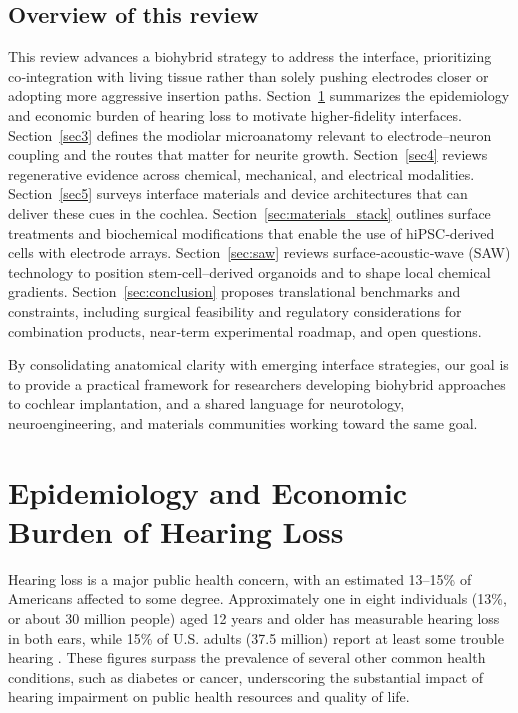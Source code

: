 \documentclass[referee,pdflatex, sn-vancouver-num]{sn-jnl}%
\theoremstyle{thmstyleone}%
\theoremstyle{thmstyletwo}%
\theoremstyle{thmstylethree}%
\begin{document}
\subsection{Overview of this review}
This review advances a biohybrid strategy to address the interface, prioritizing co‑integration with living tissue rather than solely pushing electrodes closer or adopting more aggressive insertion paths. Section~\ref{sec2} summarizes the epidemiology and economic burden of hearing loss to motivate higher‑fidelity interfaces. Section~\ref{sec3} defines the modiolar microanatomy relevant to electrode–neuron coupling and the routes that matter for neurite growth. Section~\ref{sec4} reviews regenerative evidence across chemical, mechanical, and electrical modalities. Section~\ref{sec5} surveys interface materials and device architectures that can deliver these cues in the cochlea. Section~\ref{sec:materials_stack} outlines surface treatments and biochemical modifications that enable the use of hiPSC‑derived cells with electrode arrays. Section~\ref{sec:saw} reviews surface‑acoustic‑wave (SAW) technology to position stem‑cell–derived organoids and to shape local chemical gradients. Section~\ref{sec:conclusion} proposes translational benchmarks and constraints, including surgical feasibility and regulatory considerations for combination products, near‑term experimental roadmap, and open questions.

By consolidating anatomical clarity with emerging interface strategies, our goal is to provide a practical framework for researchers developing biohybrid approaches to cochlear implantation, and a shared language for neurotology, neuroengineering, and materials communities working toward the same goal.

\section{Epidemiology and Economic Burden of Hearing Loss}\label{sec2}
\noindent 
Hearing loss is a major public health concern, with an estimated 13--15\% of Americans affected to some degree. Approximately one in eight individuals (13\%, or about 30 million people) aged 12 years and older has measurable hearing loss in both ears, while 15\% of U.S. adults (37.5 million) report at least some trouble hearing \cite{nidcd_2021, cdc2010, cdc2021, wilson2014}. These figures surpass the prevalence of several other common health conditions, such as diabetes or cancer, underscoring the substantial impact of hearing impairment on public health resources and quality of life.
\end{document}
